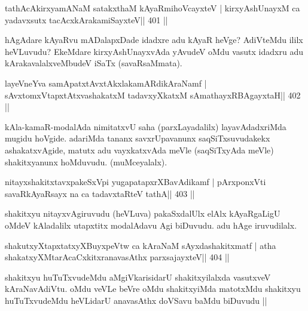 
\begin{shl}
tathAcAkirxyamANaM satakxthaM kAyaRmihoVcayxteV |
kirxyAshUnayxM ca yadavxsutx tacAcxkArakamiSayxteV\hfill || 401 ||
\end{shl}

\begin{artha}
hAgAdare kAyaRvu mADalapxDade idadxre adu kAyaR heVge? AdiVteMdu ililx heVLuvudu? EkeMdare kirxyAshUnayxvAda yAvudeV oMdu vasutx idadxru adu kArakavalalxveMbudeV iSaTx (savaRsaMmata).
\end{artha}


\begin{shl}
layeVneYva samApatxtAvxtAkxlakamARdikAraNamf |
sAvxtomxVtapxtAtxvashakatxM tadavxyXkatxM sAmathayxRBAgayxtaH\hfill || 402 ||
\end{shl}

\begin{artha}
kAla-kamaR-modalAda nimitatxvU saha (parxLayadalilx) layavAdadxriMda  mugidu hoVgide. adariMda tananx savxrUpavanunx saqSiTxsuvudakekx ashakatxvAgide, matutx adu vayxkatxvAda meVle (saqSiTxyAda meVle) shakitxyanunx hoMduvudu. (muMceyalalx).
\end{artha}

\begin{shl}
nitayxshakitxtavxpakeSxV\s pi yugapatapxrXBavAdikamf |
pArxponxVti savaRkAyaRsayx na ca tadavxtaRteV tathA\hfill || 403 ||
\end{shl}

\begin{artha}
shakitxyu nitayxvAgiruvudu (heVLuva) pakaSxdalUlx elAlx kAyaRgaLigU  oMdeV kAladalilx utapxtitx modalAdavu Agi biDuvudu. adu hAge iruvudilalx.
\end{artha}

\begin{shl}
shakutxyXtapxtatxyXBuyxpeVtw ca kAraNaM sAyxdashakitxmatf |
atha shakatxyXMtarAcaCxkitxranavasAthx parxsajayxteV\hfill || 404 ||
\end{shl}

\begin{artha}
shakitxyu huTuTxvudeMdu aMgiVkarisidarU shakitxyilalxda vasutxveV 
kAraNavAdiVtu. oMdu veVLe beVre oMdu shakitxyiMda matotxMdu shakitxyu 
huTuTxvudeMdu heVLidarU anavasAthx doVSavu baMdu biDuvudu || 
\end{artha}

